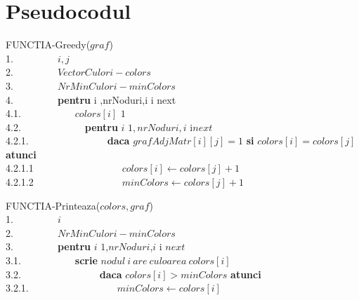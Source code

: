 \documentclass[12pt]{article}
\begin{document}
\section{Pseudocodul}
\begin{center}
\begin{tabbing}

FUNCTIA-Greedy($graf$) \\
1.\indent \ \ \ \ \ \ \ \ \  $i,j$\\
2.\indent \ \ \ \ \ \ \ \ \  $VectorCulori - colors$\\
3.\indent \ \ \ \ \ \ \ \ \  $NrMinCulori -  minColors$\\
4.\indent \ \ \ \ \ \ \ \ \ {\bf pentru}  i ,nrNoduri,i \leftarrow  i \rightarrow next \\
4.1.\indent \ \ \ \ \ \ \ \ \ \ \ $colors[i]$ \leftarrow $1$\\
4.2.\indent \ \ \ \ \ \ \ \ \ \ \ \ \  {\bf pentru} $i$ \leftarrow $1,nrNoduri,i$ \leftarrow i\rightarrow $next$ \\
4.2.1.\indent \ \ \ \ \ \ \ \ \ \ \ \ \ \ \ \  {\bf daca} $grafAdjMatr[i][j]=1$ {\bf si} $colors[i]=colors[j]$  {\bf atunci} \\
4.2.1.1\indent \ \ \ \ \ \ \ \ \ \ \ \ \ \ \ \ \ \ $colors[i] \leftarrow colors[j]+1$ \\
4.2.1.2\indent \ \ \ \ \ \ \ \ \ \ \ \ \ \ \ \ \ \ $minColors \leftarrow colors[j]+1$ \\
\end{tabbing}
\end{center}

\begin{center}
\begin{tabbing}
FUNCTIA-Printeaza($colors,graf$) \\
1.\indent \ \ \ \ \ \ \ \ \  $i$\\
2.\indent \ \ \ \ \ \ \ \ \  $NrMinCulori -  minColors$\\
3.\indent \ \ \ \ \ \ \ \ \ {\bf pentru} $i$ \leftarrow $1$,$nrNoduri$,$i$ \leftarrow i \rightarrow $next$ \\
3.1.\indent \ \ \ \ \ \ \ \ \ \ \ \textbf{scrie} $nodul\ i \ are \ culoarea \ colors[i]$\\
3.2.\indent \ \ \ \ \ \ \ \ \ \ \ \ \ \ \ \  {\bf daca} $colors[i]>minColors$  {\bf atunci} \\
3.2.1.\indent \ \ \ \ \ \ \ \ \ \ \ \ \ \ \ \ \ \ $minColors \leftarrow colors[i]$ \\

\end{tabbing}
\end{center}
\end{document}
